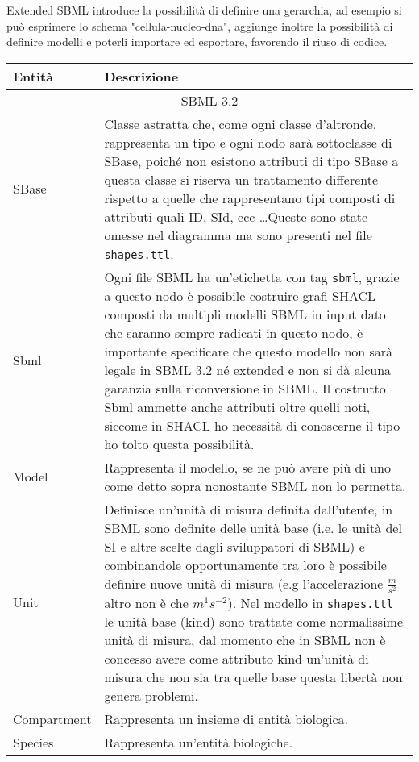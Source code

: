 \documentclass{article}
\begin{document}
Extended SBML introduce la possibilità di definire una gerarchia, ad esempio si può esprimere lo schema "cellula-nucleo-dna", aggiunge inoltre la possibilità di definire modelli e poterli importare ed esportare, favorendo il riuso di codice.

\clearpage

\begin{longtable}{p{}p{}}
    \textbf{Entità} & \textbf{Descrizione} \\
    \hline
    \multicolumn{2}{c}{SBML 3.2} \\
    \hline
    SBase & Classe astratta che, come ogni classe d'altronde, rappresenta un tipo e ogni nodo sarà sottoclasse di SBase, poiché non esistono attributi di tipo SBase a questa classe si riserva un trattamento differente rispetto a quelle che rappresentano tipi composti di attributi quali ID, SId, ecc \dots Queste sono state omesse nel diagramma ma sono presenti nel file \texttt{shapes.ttl}. \\ 
    \hline
    Sbml & Ogni file SBML ha un'etichetta con tag \texttt{sbml}, grazie a questo nodo è possibile costruire grafi SHACL composti da multipli modelli SBML in input dato che saranno sempre radicati in questo nodo, è importante specificare che questo modello non sarà legale in SBML 3.2 né extended e non si dà alcuna garanzia sulla riconversione in SBML. Il costrutto Sbml ammette anche attributi oltre quelli noti, siccome in SHACL ho necessità di conoscerne il tipo ho tolto questa possibilità.\\
    \hline
    Model & Rappresenta il modello, se ne può avere più di uno come detto sopra nonostante SBML non lo permetta. \\
    \hline
    Unit & Definisce un'unità di misura definita dall'utente, in SBML sono definite delle unità base (i.e. le unità del SI e altre scelte dagli sviluppatori di SBML) e combinandole opportunamente tra loro è possibile definire nuove unità di misura (e.g l'accelerazione $\frac{m}{s^{2}}$ altro non è che $m^{1}s^{-2}$). Nel modello in \texttt{shapes.ttl} le unità base (kind) sono trattate come normalissime unità di misura, dal momento che in SBML non è concesso avere come attributo kind un'unità di misura che non sia tra quelle base questa libertà non genera problemi. \\
    \hline 
    Compartment & Rappresenta un insieme di entità biologica. \\
    \hline
    Species & Rappresenta un'entità biologiche. \\

\end{longtable}
\end{document}
